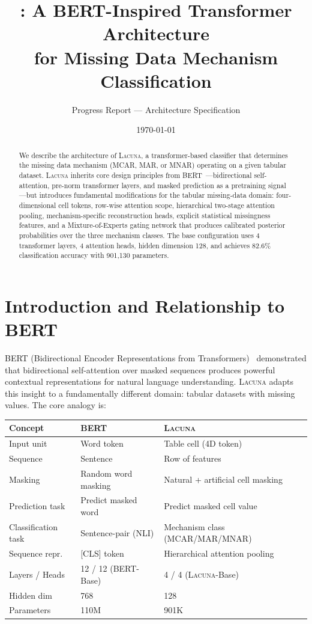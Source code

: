 \documentclass[11pt]{article}
\title{\lacuna{}: A BERT-Inspired Transformer Architecture \\
for Missing Data Mechanism Classification}
\author{Progress Report --- Architecture Specification}
\date{\today}
\newcommand{\lacuna}{\textsc{Lacuna}}
\begin{document}
\maketitle

\begin{abstract}
We describe the architecture of \lacuna{}, a transformer-based classifier that determines the missing data mechanism (MCAR, MAR, or MNAR) operating on a given tabular dataset. \lacuna{} inherits core design principles from BERT~\cite{devlin2019bert}---bidirectional self-attention, pre-norm transformer layers, and masked prediction as a pretraining signal---but introduces fundamental modifications for the tabular missing-data domain: four-dimensional cell tokens, row-wise attention scope, hierarchical two-stage attention pooling, mechanism-specific reconstruction heads, explicit statistical missingness features, and a Mixture-of-Experts gating network that produces calibrated posterior probabilities over the three mechanism classes. The base configuration uses 4 transformer layers, 4 attention heads, hidden dimension 128, and achieves 82.6\% classification accuracy with 901,130 parameters.
\end{abstract}

\section{Introduction and Relationship to BERT}

BERT (Bidirectional Encoder Representations from Transformers)~\cite{devlin2019bert} demonstrated that bidirectional self-attention over masked sequences produces powerful contextual representations for natural language understanding. \lacuna{} adapts this insight to a fundamentally different domain: tabular datasets with missing values. The core analogy is:

\begin{center}
\begin{tabular}{lll}
\toprule
\textbf{Concept} & \textbf{BERT} & \textbf{\lacuna{}} \\
\midrule
Input unit & Word token & Table cell (4D token) \\
Sequence & Sentence & Row of features \\
Masking & Random word masking & Natural + artificial cell masking \\
Prediction task & Predict masked word & Predict masked cell value \\
Classification task & Sentence-pair (NLI) & Mechanism class (MCAR/MAR/MNAR) \\
Sequence repr. & {[CLS]} token & Hierarchical attention pooling \\
Layers / Heads & 12 / 12 (BERT-Base) & 4 / 4 (\lacuna{}-Base) \\
Hidden dim & 768 & 128 \\
Parameters & 110M & 901K \\
\bottomrule
\end{tabular}
\end{center}
\end{document}
